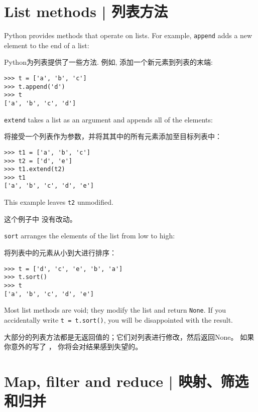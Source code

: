 \section{List methods  |  列表方法}

Python provides methods that operate on lists.  For example,
{\tt append} adds a new element to the end of a list:

Python为列表提供了一些方法. 例如,  添加一个新元素到列表的末端:

  

\begin{lstlisting}
>>> t = ['a', 'b', 'c']
>>> t.append('d')
>>> t
['a', 'b', 'c', 'd']
\end{lstlisting}
%
{\tt extend} takes a list as an argument and appends all of
the elements:

 将接受一个列表作为参数，并将其其中的所有元素添加至目标列表中：
  

\begin{lstlisting}
>>> t1 = ['a', 'b', 'c']
>>> t2 = ['d', 'e']
>>> t1.extend(t2)
>>> t1
['a', 'b', 'c', 'd', 'e']
\end{lstlisting}

%
This example leaves {\tt t2} unmodified.

这个例子中  没有改动。

{\tt sort} arranges the elements of the list from low to high:

 将列表中的元素从小到大进行排序：
  

\begin{lstlisting}
>>> t = ['d', 'c', 'e', 'b', 'a']
>>> t.sort()
>>> t
['a', 'b', 'c', 'd', 'e']
\end{lstlisting}

%
Most list methods are void; they modify the list and return {\tt None}.
If you accidentally write {\tt t = t.sort()}, you will be disappointed
with the result.

大部分的列表方法都是无返回值的；它们对列表进行修改，然后返回None。
如果你意外的写了 ， 你将会对结果感到失望的。
  
  


\section{Map, filter and reduce  |  映射、筛选和归并}
\label{filter}

